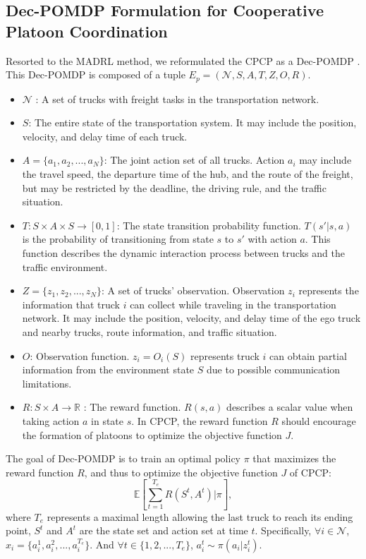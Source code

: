 \documentclass[lettersize,journal]{IEEEtran}
\begin{document}
\subsection{Dec-POMDP Formulation for Cooperative Platoon Coordination}
Resorted to the MADRL method, we reformulated the CPCP as a Dec-POMDP \cite{oliehoek2016concise}. This Dec-POMDP is composed of a tuple $E_p = (\mathcal{N} , S, A, T, Z, O, R)$.
\begin{itemize}
    \item [-] $\mathcal{N}$ : A set of trucks with freight tasks in the transportation network.
    \item [-] $S$: The entire state of the transportation system. It may include the position, velocity, and delay time of each truck.
    \item [-] $A=\{a_1,a_2,...,a_N\}$: The joint action set of all trucks. Action $a_i$ may include the travel speed, the departure time of the hub, and the route of the freight, but may be restricted by the deadline, the driving rule, and the traffic situation.
    \item [-] $T:S \times A \times S \rightarrow [0,1]$: The state transition probability function. $T(s'|s,a)$ is the probability of transitioning from state $s$ to $s'$ with action $a$. This function describes the dynamic interaction process between trucks and the traffic environment.
    \item [-] $Z=\{z_1,z_2,...,z_N\}$: A set of trucks' observation. Observation $z_i$ represents the information that truck $i$ can collect while traveling in the transportation network. It may include the position, velocity, and delay time of the ego truck and nearby trucks, route information, and traffic situation.
    \item [-] $O$: Observation function. $z_i = O_i(S)$ represents truck $i$ can obtain partial information from the environment state $S$ due to possible communication limitations.
    \item [-] $R: S \times A \rightarrow \mathbb{R}$ : The reward function. $R(s,a)$ describes a scalar value when taking action $a$ in state $s$. In CPCP, the reward function $R$ should encourage the formation of platoons to optimize the objective function $J$.
\end{itemize}
The goal of Dec-POMDP is to train an optimal policy $\pi$ that maximizes the reward function $R$, and thus to optimize the objective function $J$ of CPCP:
\begin{equation}
    \mathbb{E}[\sum_{t=1}^{T_e}R(S^t,A^t)|\pi],
\end{equation}
where $T_e$ represents a maximal length allowing the last truck to reach its ending point, $S^t$ and $A^t$ are the state set and action set at time $t$.
Specifically, $\forall i \in \mathcal{N}$, $x_i=\{a_i^1,a_i^2,...,a_i^{T_e}\}$.
And $\forall t \in \{1,2,...,T_e\}$, $a_i^t \sim \pi(a_i|z_i^t)$.
\end{document}
